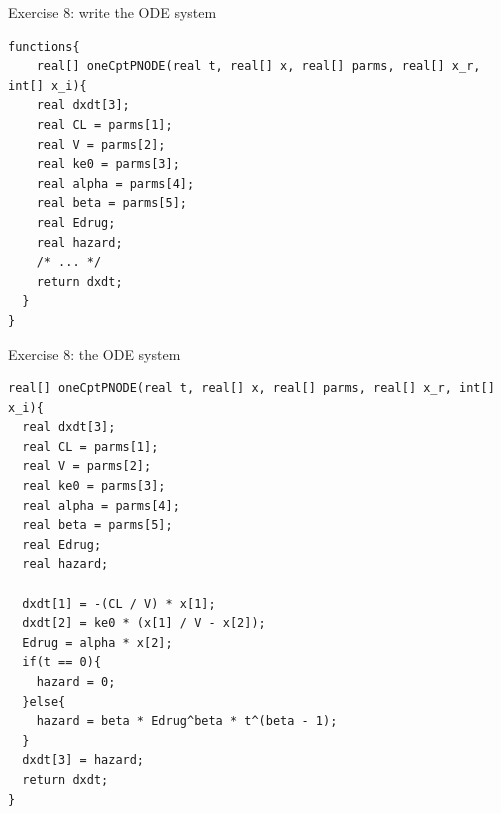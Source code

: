 \documentclass[presentation, allowframebreaks]{beamer}
\begin{document}
\begin{frame}[fragile,label={sec:org9c097ad}]{Exercise 8: write the ODE system}
 \begin{verbatim}
functions{
    real[] oneCptPNODE(real t, real[] x, real[] parms, real[] x_r, int[] x_i){
    real dxdt[3];
    real CL = parms[1];
    real V = parms[2];
    real ke0 = parms[3];
    real alpha = parms[4];
    real beta = parms[5];
    real Edrug;
    real hazard;
    /* ... */
    return dxdt;
  }
}
\end{verbatim}
\end{frame}

\begin{frame}[fragile,label={sec:org8091cf7}]{Exercise 8: the ODE system}
 \begin{verbatim}
real[] oneCptPNODE(real t, real[] x, real[] parms, real[] x_r, int[] x_i){
  real dxdt[3];
  real CL = parms[1];
  real V = parms[2];
  real ke0 = parms[3];
  real alpha = parms[4];
  real beta = parms[5];
  real Edrug;
  real hazard;

  dxdt[1] = -(CL / V) * x[1];
  dxdt[2] = ke0 * (x[1] / V - x[2]);
  Edrug = alpha * x[2];
  if(t == 0){
    hazard = 0;
  }else{
    hazard = beta * Edrug^beta * t^(beta - 1);
  }
  dxdt[3] = hazard;
  return dxdt;
}
\end{verbatim}
\end{frame}
\end{document}
